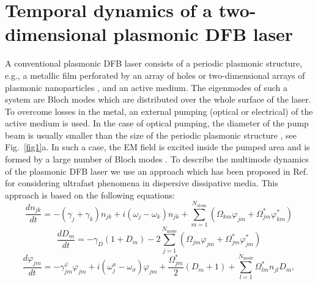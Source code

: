 \documentclass[aps,pra,amsmath,amssymb,onecolumn,superscriptaddress,showpacs,floatfix,]{revtex4-1}
\begin{document}
\section*{Temporal dynamics of a two-dimensional plasmonic DFB laser}
A conventional plasmonic DFB laser consists of a periodic plasmonic structure, e.g., a metallic film perforated by an array of holes \cite{BeijnumPRL,DorofeenkoOptExp,MengLPR,nefedkin2018acsphot,TennerJOpt,TennerACSPhot,Zyablovsky2017Optimum,Melentiev2017nanolaser} or two-dimensional arrays of plasmonic nanoparticles \cite{ZhouNatNano,SchokkerPRB,daskalakis2018nanolett,SchokkerACSPhot,YangNatComm,YangACSNano,hakala2017lasing,wang2017band}, and an active medium.
The eigenmodes of such a system are Bloch modes which are distributed over the whole surface of the laser.
To overcome losses in the metal, an external pumping (optical or electrical) of the active medium is used.
In the case of optical pumping, the diameter of the pump beam is usually smaller than the size of the periodic plasmonic structure \cite{TennerACSPhot,ZhouNatNano,daskalakis2018nanolett}, see Fig.~\ref{fig1}a.
In such a case, the EM field is excited inside the pumped area and is formed by a large number of Bloch modes \cite{TennerACSPhot,nefedkin2018acsphot}.
To describe the multimode dynamics of the plasmonic DFB laser we use an approach which has been proposed in Ref. \cite{Zyablovsky2017approach} for considering ultrafast phenomena in dispersive dissipative media.
This approach is based on the following equations:
\begin{equation}\label{eq1}
\frac{{d{n_{jk}}}}{{dt}} =  - \left( {{\gamma _j} + {\gamma _k}} \right){n_{jk}} + i\left( {{\omega _j} - {\omega _k}} \right){n_{jk}} + \sum\limits_{m=1}^{N_{\text{atom}}} {\left( {{\Omega _{km}}{\varphi _{jm}} + \Omega _{jm}^*\varphi _{km}^*} \right)} 
\end{equation}
\begin{equation}\label{eq2}
\frac{{d{D_m}}}{{dt}} =  - {\gamma _D}\left( {1 + {D_m}} \right)  - 2\sum\limits_{j=1}^{N_{\text{mode}}} {\left( {{\Omega _{jm}}{\varphi _{jm}} + \Omega _{jm}^*\varphi _{jm}^*} \right)} 
\end{equation}
\begin{equation}\label{eq3}
\frac{{d{\varphi _{jm}}}}{{dt}} =  -\gamma_{jm}^{\varphi} {\varphi _{jm}} + i\left( {{\omega _j^a} - {\omega _\sigma }} \right){\varphi _{jm}} + \frac{{\Omega _{jm}^*}}{2}\left( {{D_m} + 1} \right) + \sum\limits_{l=1}^{N_{\text{mode}}} {\Omega _{lm}^*{n_{jl}}{D_m}} , 
\end{equation}
\end{document}
